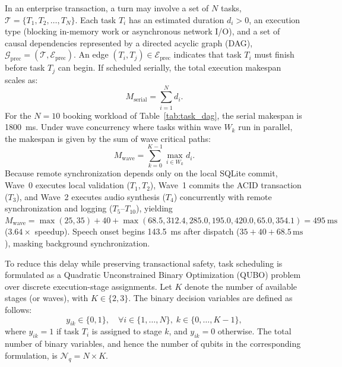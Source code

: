 \documentclass[review,12pt,times,authoryear]{elsarticle}
\theoremstyle{definition}
\begin{document}
In an enterprise transaction, a turn may involve a set of $N$ tasks, $\mathcal{T} = \{T_1, T_2, \dots, T_N\}$. Each task $T_i$ has an estimated duration $d_i > 0$, an execution type (blocking in-memory work or asynchronous network I/O), and a set of causal dependencies represented by a directed acyclic graph (DAG), $\mathcal{G}_{\text{prec}} = (\mathcal{T}, \mathcal{E}_{\text{prec}})$. An edge $(T_i, T_j) \in \mathcal{E}_{\text{prec}}$ indicates that task $T_i$ must finish before task $T_j$ can begin. If scheduled serially, the total execution makespan scales as:
\begin{equation}
M_{\text{serial}} = \sum_{i=1}^N d_i.
\end{equation}
For the $N=10$ booking workload of Table~\ref{tab:task_dag}, the serial makespan is \SI{1800}{\milli\second}. Under wave concurrency where tasks within wave $W_k$ run in parallel, the makespan is given by the sum of wave critical paths:
\begin{equation}
M_{\text{wave}} = \sum_{k=0}^{K-1} \max_{i \in W_k} d_i.
\end{equation}
Because remote synchronization depends only on the local SQLite commit, Wave~0 executes local validation ($T_1, T_2$), Wave~1 commits the ACID transaction ($T_3$), and Wave~2 executes audio synthesis ($T_4$) concurrently with remote synchronization and logging ($T_5$--$T_{10}$), yielding $M_{\text{wave}} = \max(25, 35) + 40 + \max(68.5, 312.4, 285.0, 195.0, 420.0, 65.0, 354.1) = \SI{495}{\milli\second}$ ($3.64\times$ speedup). Speech onset begins \SI{143.5}{\milli\second} after dispatch ($35 + 40 + 68.5\,\text{ms}$), masking background synchronization.

To reduce this delay while preserving transactional safety, task scheduling is formulated as a Quadratic Unconstrained Binary Optimization (QUBO) problem over discrete execution-stage assignments. Let $K$ denote the number of available stages (or waves), with $K \in \{2, 3\}$. The binary decision variables are defined as follows:
\begin{equation}
y_{ik} \in \{0, 1\}, \quad \forall i \in \{1, \dots, N\}, \; k \in \{0, \dots, K-1\},
\end{equation}
where $y_{ik} = 1$ if task $T_i$ is assigned to stage $k$, and $y_{ik} = 0$ otherwise. The total number of binary variables, and hence the number of qubits in the corresponding formulation, is $\mathcal{N}_q = N \times K$.
\end{document}
